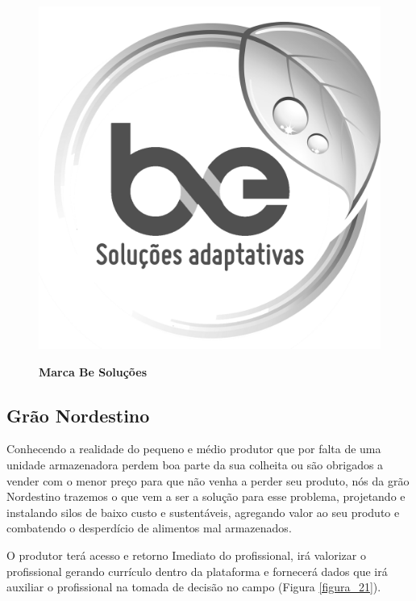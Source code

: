 \begin{figure}[!htb]
\centering
\caption{\textbf{Marca Be Soluções}}
\includegraphics[scale=0.4]{Imagens/besolucoes.png}
\label{figura_20}
\end{figure}




\subsection{Grão Nordestino}

Conhecendo a realidade do pequeno e médio produtor que por falta de uma unidade armazenadora perdem boa parte da sua colheita ou são obrigados a vender com o menor preço para que não venha a perder seu produto, nós da grão Nordestino trazemos o que vem a ser a solução para esse problema, projetando e instalando silos de baixo custo e sustentáveis, agregando valor ao seu produto e combatendo o desperdício de alimentos mal armazenados.

O produtor terá acesso e retorno Imediato do profissional, irá valorizar o profissional gerando currículo dentro da plataforma e fornecerá dados que irá auxiliar o profissional na tomada de decisão no campo (Figura \ref{figura_21}).


